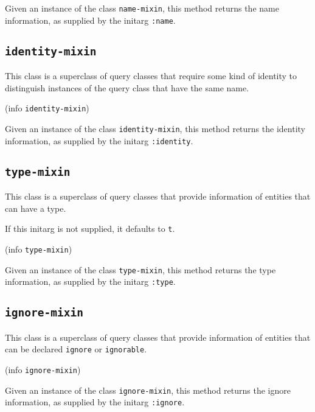 Given an instance of the class \texttt{name-mixin}, this method
returns the name information, as supplied by the initarg
\texttt{:name}.

\subsection{\texttt{identity-mixin}}


This class is a superclass of query classes that require some kind of
identity to distinguish instances of the query class that have the
same name.


 {(info {\tt identity-mixin})}

Given an instance of the class \texttt{identity-mixin}, this method
returns the identity information, as supplied by the initarg
\texttt{:identity}.

\subsection{\texttt{type-mixin}}


This class is a superclass of query classes that provide information
of entities that can have a type.


If this initarg is not supplied, it defaults to \texttt{t}.

 {(info {\tt type-mixin})}

Given an instance of the class \texttt{type-mixin}, this method
returns the type information, as supplied by the initarg
\texttt{:type}.

\subsection{\texttt{ignore-mixin}}


This class is a superclass of query classes that provide information
of entities that can be declared \texttt{ignore} or \texttt{ignorable}.


 {(info {\tt ignore-mixin})}

Given an instance of the class \texttt{ignore-mixin}, this method
returns the ignore information, as supplied by the initarg
\texttt{:ignore}.

